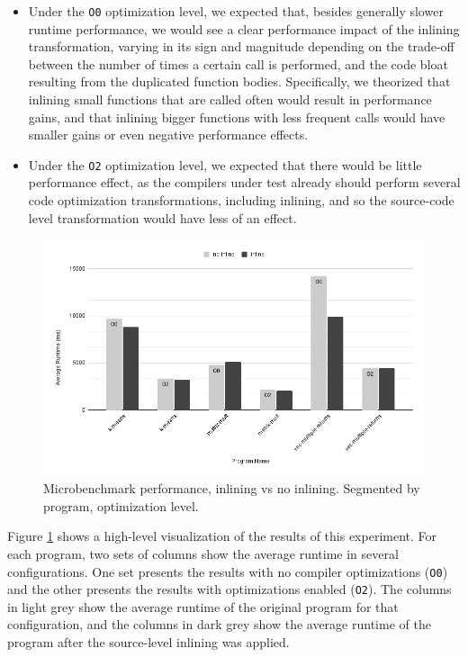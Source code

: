 \begin{itemize}
    \item Under the \texttt{O0} optimization level, we expected that, besides generally slower runtime performance, we would see a clear performance impact of the inlining transformation, varying in its sign and magnitude depending on the trade-off between the number of times a certain call is performed, and the code bloat resulting from the duplicated function bodies. Specifically, we theorized that inlining small functions that are called often would result in performance gains, and that inlining bigger functions with less frequent calls would have smaller gains or even negative performance effects.
    \item Under the \texttt{O2} optimization level, we expected that there would be little performance effect, as the compilers under test already should perform several code optimization transformations, including inlining, and so the source-code level transformation would have less of an effect.
\end{itemize}

\begin{figure}
    \centering
    \includegraphics[width=\textwidth]{figures/benchmark-chart.png}
    \caption{Microbenchmark performance, inlining vs no inlining. Segmented by program, optimization level.}
    \label{fig:expb-chart}
\end{figure}

Figure \ref{fig:expb-chart} shows a high-level visualization of the results of this experiment. For each program, two sets of columns show the average runtime in several configurations. One set presents the results with no compiler optimizations (\texttt{O0}) and the other presents the results with optimizations enabled (\texttt{O2}). The columns in light grey show the average runtime of the original program for that configuration, and the columns in dark grey show the average runtime of the program after the source-level inlining was applied.

